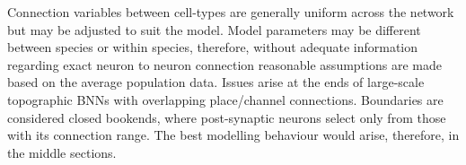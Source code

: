 Connection variables between cell-types are generally uniform across the network but may be adjusted to suit the model.
Model parameters may be different between species or within species, therefore, without adequate information regarding exact neuron to neuron connection reasonable assumptions are made based on the average population data.
Issues arise at the ends of large-scale topographic BNNs with overlapping place\slash channel connections.
Boundaries are considered closed bookends, where post-synaptic neurons select only from those with its connection range.
The best modelling behaviour would arise, therefore, in the middle sections.










